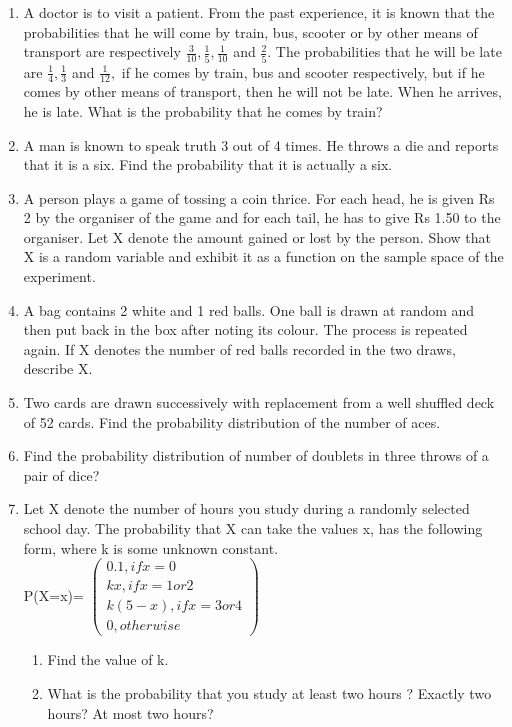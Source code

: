 \begin{enumerate}[label=\arabic*.,ref=\thesubsection.\theenumi]
\item A doctor is to visit a patient. From the past experience, it is known that the probabilities that he will come by train, bus, scooter or by other means of transport are respectively $\frac{3}{10},\frac{1}{5},\frac{1}{10}$ and $\frac{2}{5}.$ The probabilities that he will be late are $\frac{1}{4},\frac{1}{3}$ and $\frac{1}{12},$ if he comes by train, bus and scooter respectively, but if he comes by other means of transport, then he will not be late. When he arrives, he is late. What is the probability that he comes by train?\\

\item A man is known to speak truth 3 out of 4 times. He throws a die and reports that it is a six. Find the probability that it is actually a six.\\

\item A person plays a game of tossing a coin thrice. For each head, he is given Rs 2 by the organiser of the game and for each tail, he has to give Rs 1.50 to the organiser. Let X denote the amount gained or lost by the person. Show that X is a random variable and exhibit it as a function on the sample space of the experiment.\\

\item A bag contains 2 white and 1 red balls. One ball is drawn at random and then put back in the box after noting its colour. The process is repeated again. If X denotes the number of red balls recorded in the two draws, describe X.\\

\item Two cards are drawn successively with replacement from a well shuffled deck of 52 cards. Find the probability distribution of the number of aces.\\

\item Find the probability distribution of number of doublets in three throws of a pair of dice?\\

\item Let X denote the number of hours you study during a randomly selected school day. The probability that X can take the values x, has the following form, where k is some unknown constant.\\
P(X=x)= $\begin{pmatrix} 0.1, if x= 0 \\ kx,if x= 1 or 2 \\ k(5-x), if x= 3 or 4 \\ 0, otherwise \end{pmatrix}$
\begin{enumerate}
\item  Find the value of k.
\item  What is the probability that you study at least two hours ? Exactly two hours? At
most two hours?
\end{enumerate}


\end{enumerate}
